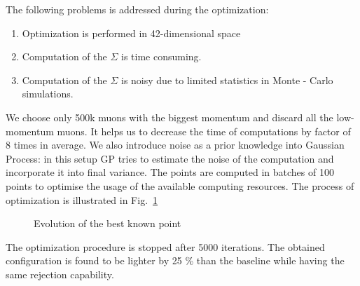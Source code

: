 \documentclass[a4paper]{jpconf}
\theoremstyle{my_theorem_style}
\numberwithin{equation}{section}
\begin{document}
The following problems is addressed during the optimization:
\begin{enumerate}
\item Optimization is performed in 42-dimensional space
\item Computation of the $\Sigma$ is time consuming.
\item Computation of the $\Sigma$ is noisy due to limited statistics
  in Monte - Carlo simulations.
\end{enumerate}

We choose only 500k muons with the biggest momentum and discard
all the low-momentum muons. It helps us to decrease the time of
computations by factor of  8 times in average. We also introduce noise
as a prior knowledge into Gaussian Process: in this setup GP tries to
estimate the noise of the computation and incorporate it into final
variance. The points are computed in batches of 100 points to optimise
the usage of the available computing resources. The process of
optimization is illustrated in Fig.~\ref{fig:evolution}

\begin{figure}[H]
\caption{\label{fig:evolution}Evolution of the best known point}
\end{figure}


The optimization procedure is stopped after 5000 iterations. 
The obtained configuration is found to be lighter by 25 \% than the baseline while having the same rejection capability. 
\end{document}
